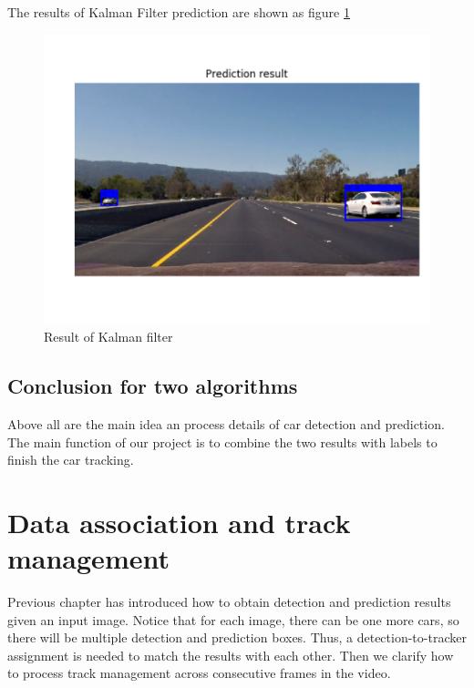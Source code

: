 \documentclass[10pt,twocolumn,letterpaper]{article}
\begin{document}
The results of Kalman Filter prediction are shown as figure \ref{fig:2_1_4}
\begin{figure}[t]
\begin{center}
   \includegraphics[width=0.9\linewidth]{kalman_r}
\end{center}
   \caption{Result of Kalman filter}
\label{fig:2_1_4}
\end{figure}
\subsection{Conclusion for two algorithms}
Above all are the main idea an process details of car detection and prediction. The main function of our project is to combine the two results with labels to finish the car tracking.

\section{Data association and track management}

Previous chapter has introduced how to obtain detection and prediction results given an input image. Notice that for each image, there can be one more cars, so there will be multiple detection and prediction boxes. Thus, a detection-to-tracker assignment is needed to match the results with each other. Then we clarify how to process track management across consecutive frames in the video.
\end{document}
